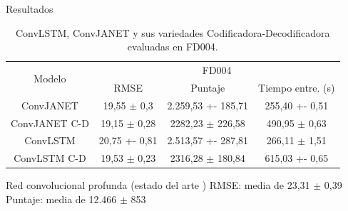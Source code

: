 \begin{frame}{Resultados}
\begin{table}[H]
\centering
 
\label{tab:test_FD004}
\begin{tabular}{@{}cccc@{}}
\toprule
\multirow{2}{*}{Modelo} & \multicolumn{3}{c}{FD004}                     \\ \cmidrule(l){2-4} 
                       & RMSE        & Puntaje           & Tiempo entre. (s) \\ \cmidrule(r){1-1}
ConvJANET              & 19,55  $\pm$  0,3  & {\color[HTML]{3166FF}2.259,53  +-  185,71} & {\color[HTML]{3166FF}255,40  +-  0,51}  \\
ConvJANET C-D          & {\color[HTML]{3166FF}19,15}   $\pm$   {\color[HTML]{3166FF}0,28} & 2282,23  $\pm$  226,58 & 490,95  $\pm$  0,63  \\
ConvLSTM               & {\color[HTML]{FE0000}20,75 +- 0,81} & {\color[HTML]{FE0000}2.513,57  +-  287,81} & 266,11  $\pm$  1,51  \\
ConvLSTM C-D           & 19,53  $\pm$  0,23 & 2316,28  $\pm$  180,84 & {\color[HTML]{FE0000}615,03  +-  0,65}  \\ \bottomrule
\end{tabular}
\caption{ConvLSTM, ConvJANET y sus variedades Codificadora-Decodificadora evaluadas en FD004. }
\end{table}
\pause
\begin{block}{Red convolucional profunda (estado del arte \cite{estado-arte})}
RMSE: media de 23,31 $\pm$ 0,39\\
Puntaje: media de 12.466 $\pm$ 853
\end{block}
\end{frame}

